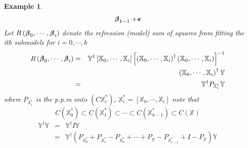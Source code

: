 \documentclass{article}
\newtheorem{example}[theorem]{Example}
\begin{document}
\begin{example}
\begin{eqnarray*}
\beta\mkern-9.6mu \beta%
_{k-1}+%
\epsilon\mkern-10mu \epsilon%
\end{eqnarray*}%
\newline
\newline
Let $R\left( 
\beta\mkern-9.6mu \beta%
_{0},\cdots ,%
\beta\mkern-9.6mu \beta%
_{i}\right) $ denote the refression (model) sum of squares from fitting the
ith submodels for $i=0,\cdots ,k$%
\begin{eqnarray*}
R\left( 
\beta\mkern-9.6mu \beta%
_{0},\cdots ,%
\beta\mkern-9.6mu \beta%
_{i}\right) &=&\mathbb{Y}^{\dagger }\left[ \mathbb{X}_{0},\cdots ,\mathbb{X}%
_{i}\right] \left[ \left( \mathbb{X}_{0},\cdots ,\mathbb{X}_{i}\right)
^{\dagger }\left( \mathbb{X}_{0},\cdots ,\mathbb{X}_{i}\right) \right] ^{-1}
\\
&&\left( \mathbb{X}_{0},\cdots ,\mathbb{X}_{i}\right) ^{\dagger }\mathbb{Y}
\\
&=&\mathbb{Y}^{\dagger }P_{\mathbb{X}_{i}^{\ast }}\mathbb{Y}
\end{eqnarray*}%
where $P_{\mathbb{X}_{i}^{\ast }}$ is the p.p.m onto $\left( C\mathbb{X}%
_{i}^{\ast }\right) $, $\mathbb{X}_{i}^{\ast }=\left[ \mathbb{X}_{0},\cdots ,%
\mathbb{X}_{i}\right] $\newline
\newline
note that%
\begin{equation*}
C\left( \mathbb{X}_{0}^{\ast }\right) \subset C\left( \mathbb{X}_{1}^{\ast
}\right) \subset \cdots \subset C\left( \mathbb{X}_{k-1}^{\ast }\right)
\subset C\left( \mathbb{X}\right)
\end{equation*}
\newline
\newline
\begin{eqnarray*}
\mathbb{Y}^{\dagger }\mathbb{Y} &=&\mathbb{Y}^{\dagger }I\mathbb{Y} \\
&=&\mathbb{Y}^{\dagger }\left( P_{\mathbb{X}_{0}^{\ast }}+P_{\mathbb{X}%
_{1}^{\ast }}-P_{\mathbb{X}_{0}^{\ast }}+\cdots +P_{\mathbb{X}}-P_{\mathbb{X}%
_{i-1}^{\ast }}+I-P_{\mathbb{X}}\right) \mathbb{Y} \\

\end{eqnarray*}
\end{example}
\end{document}
